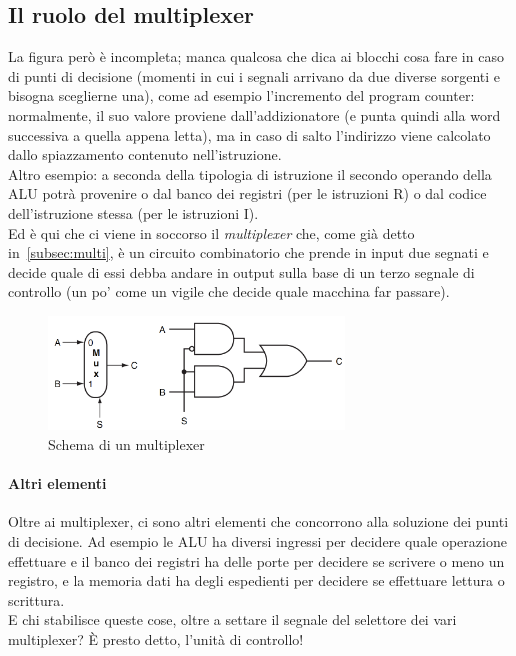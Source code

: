 \documentclass[class=book, crop=false, oneside]{standalone}
\begin{document}
\subsection{Il ruolo del multiplexer}
La  figura però è incompleta; manca qualcosa che dica ai blocchi cosa fare in caso di punti di decisione (momenti in cui i segnali arrivano da due diverse sorgenti e bisogna sceglierne una), come ad esempio l'incremento del program counter: normalmente, il suo valore proviene dall'addizionatore (e punta quindi alla word successiva a quella appena letta), ma in caso di salto l'indirizzo viene calcolato dallo spiazzamento contenuto nell'istruzione.\\
Altro esempio: a seconda della tipologia di istruzione il secondo operando della ALU potrà provenire o dal banco dei registri (per le istruzioni R) o dal codice dell'istruzione stessa (per le istruzioni I).\\
Ed è qui che ci viene in soccorso il \emph{multiplexer} che, come già detto in~\ref{subsec:multi}, è un circuito combinatorio che prende in input due segnati e decide quale di essi debba andare in output sulla base di un terzo segnale di controllo (un po' come un vigile che decide quale macchina far passare).
\begin{figure}[H]
	\centering
	\includegraphics[width=0.7\textwidth,keepaspectratio]{multi}
	\caption{Schema di un multiplexer}
\end{figure}
\paragraph{Altri elementi}
Oltre ai multiplexer, ci sono altri elementi che concorrono alla soluzione dei punti di decisione. Ad esempio le ALU ha diversi ingressi per decidere quale operazione effettuare e il banco dei registri ha delle porte per decidere se scrivere o meno un registro, e la memoria dati ha degli espedienti per decidere se effettuare lettura o scrittura.\\
E chi stabilisce queste cose, oltre a settare il segnale del selettore dei vari multiplexer?  È presto detto, l’unità di controllo!\\
\end{document}

